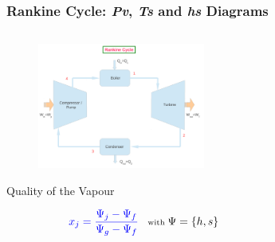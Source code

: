\documentclass[10pt,compress,handout,ignorenonframetext]{beamer}
\newcommand{\frc}{\displaystyle\frac}
\newcommand{\blue}{\textcolor{blue}}
\begin{document}
\begin{frame}
 \frametitle{Rankine Cycle: {\it Pv}, {\it Ts} and {\it hs} Diagrams}
 \begin{columns}
%
   \begin{column}[l]{0.45\linewidth}
    \begin{figure}%
     \begin{center}
      \includegraphics[width=5.5cm,clip]{./Pics/Simple_Rankine_Cycle}
     \end{center}
    \end{figure} 
    \begin{block}{\begin{center}Quality of the Vapour\end{center}}
       \begin{equation}\scriptsize
         \blue{x_{j} = \frc{\Psi_{j}-\Psi_{f}}{\Psi_{g}-\Psi_{f}}} \;\;\;\text{with }\Psi=\left\{h,s\right\}
       \end{equation}
    \end{block}
   \end{column}
%
   \begin{column}[c]{0.55\linewidth}
    \begin{figure}%
     \begin{center}
     \end{center}
    \end{figure}  
   \end{column}
  \end{columns}
\end{frame}
\end{document}
